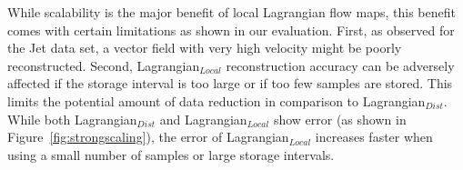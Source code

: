 While scalability is the major benefit of local Lagrangian flow maps, this benefit comes with certain limitations as shown in our evaluation.
%
First, as observed for the Jet data set, a vector field with very high velocity might be poorly reconstructed.
%
%
Second, Lagrangian$_{Local}$ reconstruction accuracy can be adversely affected if the storage interval is too large or if too few samples are stored.
%
This limits the potential amount of data reduction in comparison to Lagrangian$_{Dist}$.
%
%
%
%
%
While both Lagrangian$_{Dist}$ and Lagrangian$_{Local}$ show error (as shown in Figure~\ref{fig:strongscaling}), the error of Lagrangian$_{Local}$ increases faster when using a small number of samples or large storage intervals.
%

